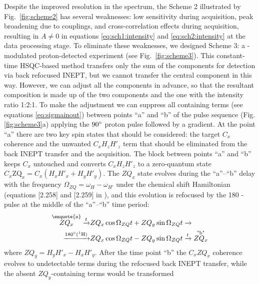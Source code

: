 \documentclass[twocolumn]{svjour3}           %
\begin{document}
Despite the improved resolution in the \clab{} spectrum, the Scheme 2 
illustrated by Fig.~\ref{fig:scheme2} has several weaknesses: low 
sensitivity during 
\clab{} acquisition, peak bro\-ade\-ning due to \oneJcc{} couplings, and 
cross-correlation effects during \clab{} acquisition, resulting in 
$A \ne 0$ in equations \eqref{eq:sch1:intensity} and \eqref{eq:sch2:intensity} 
at the data processing stage. 
To eliminate these weaknesses, 
we designed Scheme 3: a \oneJch-modulated proton-de\-tec\-ted experiment 
(see Fig.~\ref{fig:scheme3}). This constant-time {HSQC}-based method 
transfers only the sum 
of the \qouter{} components \TermOuter{} for detection via back refocused 
{INEPT}, but we cannot transfer the central component in this way. However, 
we can adjust all the components in advance, so that the resultant 
composition is made up of the two \qouter{} components and the \qinner{} one with the intensity ratio 1:2:1. 
To make the adjustment we can suppress all \hlab{} containing terms 
(see equations \eqref{eq:sigmainout})
between points \enquote{a} and \enquote{b} of the pulse sequence (Fig. \ref{fig:scheme3}a) 
applying the $90\degree$ proton pulse followed by a gradient. 
At the point \enquote{a} there are two key spin states that should be considered: the target 
$C_x$ coherence and the unwanted $C_x H_z H'_z$ term that should
be eliminated from the back INEPT transfer and the acquisition. The block between points 
\enquote{a} and \enquote{b} keeps $C_x$ untouched and converts $C_x H_z H'_z$ 
to a zero-quantum state 
$C_x \text{ZQ}_x =  C_x (H_x H'_x + H_y H'_y)$.
The $ZQ_x$ state evolves during the \enquote{a}--\enquote{b} delay with the frequency
$\Omega_{ZQ}=\omega_{H}-\omega_{H'}$ under the chemical shift Hamiltonian
(equations [2.258] and [2.259] in 
\cite{cavanagh_protein_2007}), and
this evolution is refocused by the 180\degree{} \hlab-pulse at the middle of the 
\enquote{a}--\enquote{b} time period:
\begin{align}
  \label{eq:zqx:refocus}
  \overset{\text{\enquote{a}}}{ZQ_x}  
    \xrightarrow{t} & ZQ_x \cos \Omega_{ZQ}t + ZQ_y \sin \Omega_{ZQ}t
    \xrightarrow{} \nonumber \\
    \xrightarrow{\text{180\degree (\hlab)}} & 
      ZQ_x \cos \Omega_{ZQ}t - ZQ_y \sin \Omega_{ZQ}t
      \xrightarrow{t} \overset{\text{"b"}}{ZQ_x}
\end{align}
where $ZQ_y = H_y H'_x - H_x H'_y$. 
After the time point \enquote{b} the $C_x ZQ_x$ coherence evolves to undetectable 
terms during the refocused 
back INEPT transfer, while the absent $ZQ_y$-containing terms would be transformed 
\end{document}
